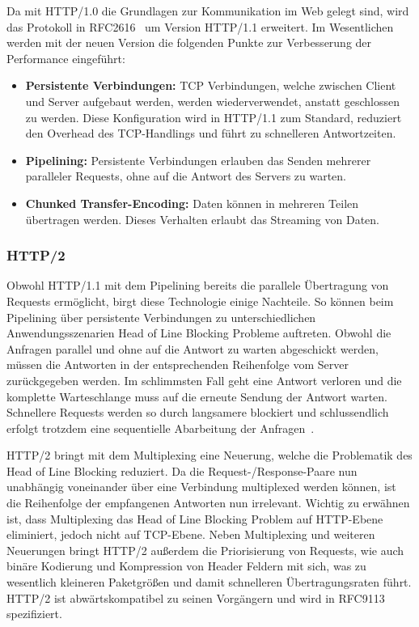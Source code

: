 Da mit HTTP/1.0 die Grundlagen zur Kommunikation im Web gelegt sind, wird das Protokoll in RFC2616~\cite{rfc2616} um Version HTTP/1.1 erweitert.
Im Wesentlichen werden mit der neuen Version die folgenden Punkte zur Verbesserung der Performance eingeführt:

\begin{itemize}
    \item \textbf{Persistente Verbindungen:} TCP Verbindungen, welche zwischen Client und Server aufgebaut werden, werden wiederverwendet, anstatt geschlossen zu werden.
    Diese Konfiguration wird in HTTP/1.1 zum Standard, reduziert den Overhead des TCP-Handlings und führt zu schnelleren Antwortzeiten.
    \item \textbf{Pipelining:} Persistente Verbindungen erlauben das Senden mehrerer paralleler Requests, ohne auf die Antwort des Servers zu warten.
    \item \textbf{Chunked Transfer-Encoding:} Daten können in mehreren Teilen übertragen werden.
    Dieses Verhalten erlaubt das Streaming von Daten.
\end{itemize}

\subsubsection{HTTP/2}

Obwohl HTTP/1.1 mit dem Pipelining bereits die parallele Übertragung von Requests ermöglicht, birgt diese Technologie einige Nachteile.
So können beim Pipelining über persistente Verbindungen zu unterschiedlichen Anwendungsszenarien Head of Line Blocking Probleme auftreten.
Obwohl die Anfragen parallel und ohne auf die Antwort zu warten abgeschickt werden, müssen die Antworten in der entsprechenden Reihenfolge vom Server zurückgegeben werden.
Im schlimmsten Fall geht eine Antwort verloren und die komplette Warteschlange muss auf die erneute Sendung der Antwort warten.
Schnellere Requests werden so durch langsamere blockiert und schlussendlich erfolgt trotzdem eine sequentielle Abarbeitung der Anfragen~\cite{7179400}.

HTTP/2 bringt mit dem Multiplexing eine Neuerung, welche die Problematik des Head of Line Blocking reduziert.
Da die Request-/Response-Paare nun unabhängig voneinander über eine Verbindung multiplexed werden können, ist die Reihenfolge der empfangenen Antworten nun irrelevant.
Wichtig zu erwähnen ist, dass Multiplexing das Head of Line Blocking Problem auf HTTP-Ebene eliminiert, jedoch nicht auf TCP-Ebene.
Neben Multiplexing und weiteren Neuerungen bringt HTTP/2 außerdem die Priorisierung von Requests, wie auch binäre Kodierung und Kompression von Header Feldern mit sich, was zu wesentlich kleineren Paketgrößen und damit schnelleren Übertragungsraten führt.
HTTP/2 ist abwärtskompatibel zu seinen Vorgängern und wird in RFC9113~\cite{rfc9113} spezifiziert.

